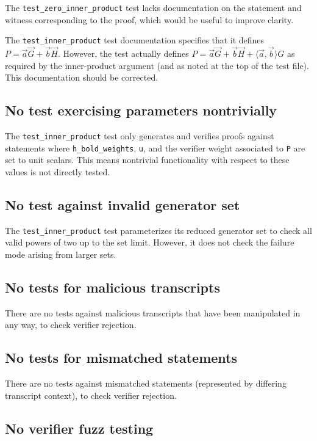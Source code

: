 \documentclass{article}
\begin{document}
The \texttt{test\_zero\_inner\_product} test lacks documentation on the statement and witness corresponding to the proof, which would be useful to improve clarity.

The \texttt{test\_inner\_product} test documentation specifies that it defines $P = \vec{a} \vec{G} + \vec{b} \vec{H}$.
However, the test actually defines $P = \vec{a} \vec{G} + \vec{b} \vec{H} + \langle \vec{a}, \vec{b} \rangle G$ as required by the inner-product argument (and as noted at the top of the test file).
This documentation should be corrected.


\subsection{No test exercising parameters nontrivially}

The \texttt{test\_inner\_product} test only generates and verifies proofs against statements where \texttt{h\_bold\_weights}, \texttt{u}, and the verifier weight associated to \texttt{P} are set to unit scalars.
This means nontrivial functionality with respect to these values is not directly tested.


\subsection{No test against invalid generator set}

The \texttt{test\_inner\_product} test parameterizes its reduced generator set to check all valid powers of two up to the set limit.
However, it does not check the failure mode arising from larger sets.


\subsection{No tests for malicious transcripts}

There are no tests against malicious transcripts that have been manipulated in any way, to check verifier rejection.


\subsection{No tests for mismatched statements}

There are no tests against mismatched statements (represented by differing transcript context), to check verifier rejection.


\subsection{No verifier fuzz testing}
\end{document}
